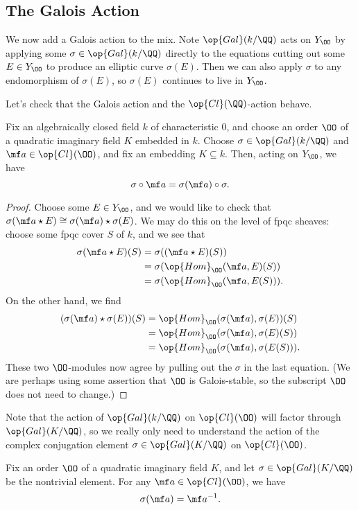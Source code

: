 \documentclass[../notes.tex]{subfiles}
\begin{document}
\subsection{The Galois Action}
We now add a Galois action to the mix. Note $\op{Gal}(k/\QQ)$ acts on $Y_\OO$ by applying some $\sigma\in\op{Gal}(k/\QQ)$ directly to the equations cutting out some $E\in Y_\OO$ to produce an elliptic curve $\sigma(E)$. Then we can also apply $\sigma$ to any endomorphism of $\sigma(E)$, so $\sigma(E)$ continues to live in $Y_\OO$.

Let's check that the Galois action and the $\op{Cl}(\QQ)$-action behave.
\begin{lemma} \label{lem:galois-and-cl-action-commute}
	Fix an algebraically closed field $k$ of characteristic $0$, and choose an order $\OO$ of a quad\-ratic imaginary field $K$ embedded in $k$. Choose $\sigma\in\op{Gal}(k/\QQ)$ and $\mf a\in\op{Cl}(\OO)$, and fix an embedding $K\subseteq k$. Then, acting on $Y_\OO$, we have
	\[\sigma\circ\mf a=\sigma(\mf a)\circ\sigma.\]
\end{lemma}
\begin{proof}
	Choose some $E\in Y_\OO$, and we would like to check that $\sigma(\mf a\star E)\cong\sigma(\mf a)\star\sigma(E)$. We may do this on the level of fpqc sheaves: choose some fpqc cover $S$ of $k$, and we see that
	\begin{align*}
		\sigma(\mf a\star E)(S) &= \sigma((\mf a\star E)(S)) \\
		&= \sigma(\op{Hom}_\OO(\mf a,E)(S)) \\
		&= \sigma(\op{Hom}_\OO(\mf a,E(S))).
	\end{align*}
	On the other hand, we find
	\begin{align*}
		(\sigma(\mf a)\star\sigma(E))(S) &= \op{Hom}_\OO(\sigma(\mf a),\sigma(E))(S) \\
		&= \op{Hom}_\OO(\sigma(\mf a),\sigma(E)(S)) \\
		&= \op{Hom}_\OO(\sigma(\mf a),\sigma(E(S))).
	\end{align*}
	These two $\OO$-modules now agree by pulling out the $\sigma$ in the last equation. (We are perhaps using some assertion that $\OO$ is Galois-stable, so the subscript $\OO$ does not need to change.)
\end{proof}
Note that the action of $\op{Gal}(k/\QQ)$ on $\op{Cl}(\OO)$ will factor through $\op{Gal}(K/\QQ)$, so we really only need to understand the action of the complex conjugation element $\sigma\in\op{Gal}(K/\QQ)$ on $\op{Cl}(\OO)$.
\begin{lemma} \label{lem:galois-action-on-cl}
	Fix an order $\OO$ of a quadratic imaginary field $K$, and let $\sigma\in\op{Gal}(K/\QQ)$ be the nontrivial element. For any $\mf a\in\op{Cl}(\OO)$, we have
	\[\sigma(\mf a)=\mf a^{-1}.\]
\end{lemma}
\end{document}
